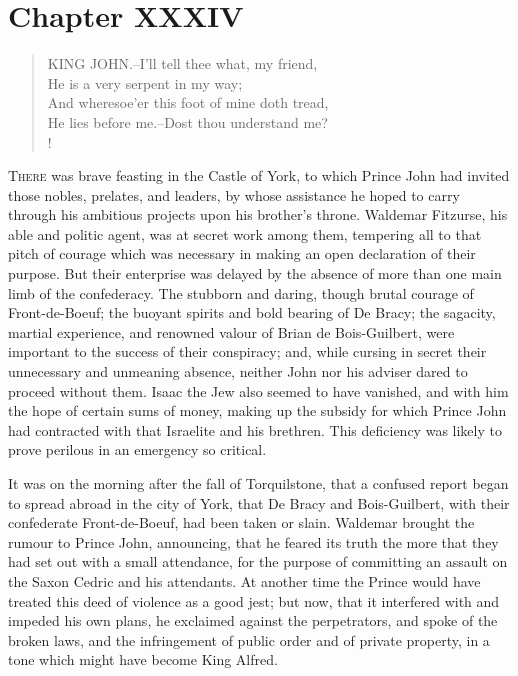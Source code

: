 \chapter{Chapter XXXIV}

\begin{verse}
KING JOHN.--I'll tell thee what, my friend,\\
He is a very serpent in my way;\\
And wheresoe'er this foot of mine doth tread,\\
He lies before me.--Dost thou understand me?\\!
\end{verse}

\lettrine{T}{here} was brave feasting in the Castle of York, to which
Prince John had
invited those nobles, prelates, and leaders, by whose assistance he
hoped to carry through his ambitious projects upon his brother's throne.
Waldemar Fitzurse, his able and politic agent, was at secret work among
them, tempering all to that pitch of courage which was necessary in
making an open declaration of their purpose. But their enterprise was
delayed by the absence of more than one main limb of the confederacy.
The stubborn and daring, though brutal courage of Front-de-Boeuf; the
buoyant spirits and bold bearing of De Bracy; the sagacity, martial
experience, and renowned valour of Brian de Bois-Guilbert, were
important to the success of their conspiracy; and, while cursing in
secret their unnecessary and unmeaning absence, neither John nor his
adviser dared to proceed without them. Isaac the Jew also seemed to have
vanished, and with him the hope of certain sums of money, making up the
subsidy for which Prince John had contracted with that Israelite and his
brethren. This deficiency was likely to prove perilous in an emergency
so critical.

It was on the morning after the fall of Torquilstone, that a confused
report began to spread abroad in the city of York, that De Bracy and
Bois-Guilbert, with their confederate Front-de-Boeuf, had been taken or
slain. Waldemar brought the rumour to Prince John, announcing, that he
feared its truth the more that they had set out with a small attendance,
for the purpose of committing an assault on the Saxon Cedric and his
attendants. At another time the Prince would have treated this deed of
violence as a good jest; but now, that it interfered with and impeded
his own plans, he exclaimed against the perpetrators, and spoke of the
broken laws, and the infringement of public order and of private
property, in a tone which might have become King Alfred.

